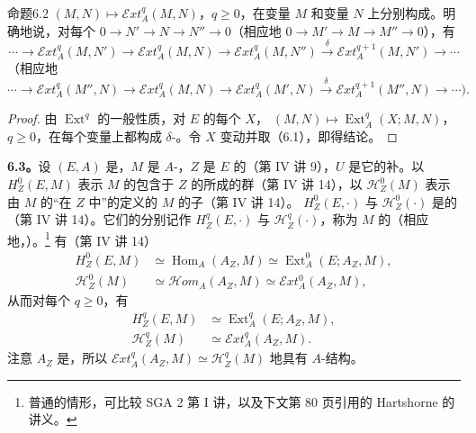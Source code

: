 \begin{SGAresult}{命题}{6.2}
 $(M,N)\mapsto\mathscr Ext_A^q(M,N)$，$q\geq0$，在变量 $M$ 和变量 $N$ 上分别构成。明确地说，对每个 $0\to N'\to N\to N''\to0$（相应地 $0\to M'\to M\to M''\to0$），有
\begin{equation}\cdots\to\mathscr Ext_A^q(M,N')\to\mathscr Ext_A^q(M,N)\to\mathscr Ext_A^q(M,N'')\xrightarrow{\delta}\mathscr Ext_A^{q+1}(M,N')\to\cdots\tag{6.2.1}\end{equation}
（相应地
\begin{equation}\cdots\to\mathscr Ext_A^q(M'',N)\to\mathscr Ext_A^q(M,N)\to\mathscr Ext_A^q(M',N)\xrightarrow{\delta}\mathscr Ext_A^{q+1}(M'',N)\to\cdots).\tag{6.2.2}\end{equation}
\end{SGAresult}
\begin{proof}由 $\operatorname{Ext}^q$ 的一般性质，对 $E$ 的每个 $X$， $(M,N)\mapsto\operatorname{Ext}_A^q(X;M,N)$，$q\geq0$，在每个变量上都构成 $\delta$-。令 $X$ 变动并取（6.1），即得结论。\end{proof}
\textbf{6.3。}设 $(E,A)$ 是，$M$ 是 $A$-，$Z$ 是 $E$ 的（第 IV 讲 9），$U$ 是它的补。以 $H_Z^0(E,M)$ 表示 $M$ 的包含于 $Z$ 的所成的群（第 IV 讲 14），以 $\mathscr H_Z^0(M)$ 表示由 $M$ 的“在 $Z$ 中”的定义的 $M$ 的子（第 IV 讲 14）。 $H_Z^0(E,\cdot)$ 与 $\mathscr H_Z^0(\cdot)$ 是的（第 IV 讲 14）。它们的分别记作 $H_Z^q(E,\cdot)$ 与 $\mathscr H_Z^q(\cdot)$，称为 $M$ 的（相应地，）。\footnote{普通的情形，可比较 SGA 2 第 I 讲，以及下文第 80 页引用的 Hartshorne 的讲义。}
有（第 IV 讲 14）
\begin{align}H_Z^0(E,M)&\simeq\operatorname{Hom}_A(A_Z,M)\simeq\operatorname{Ext}_A^0(E;A_Z,M),\tag{6.3.1}\\
\mathscr H_Z^0(M)&\simeq\mathscr Hom_A(A_Z,M)\simeq\mathscr Ext_A^0(A_Z,M),\tag{6.3.2}\end{align}
从而对每个 $q\geq0$，有
\begin{align}H_Z^q(E,M)&\simeq\operatorname{Ext}_A^q(E;A_Z,M),\tag{6.3.3}\\
\mathscr H_Z^q(M)&\simeq\mathscr Ext_A^q(A_Z,M).\tag{6.3.4}\end{align}
注意 $A_Z$ 是，所以 $\mathscr Ext_A^q(A_Z,M)\simeq\mathscr H_Z^q(M)$ 地具有 $A$-结构。

